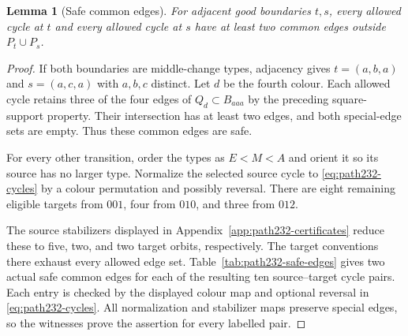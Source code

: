 \documentclass[11pt]{article}
\newtheorem{lemma}[theorem]{Lemma}
\theoremstyle{remark}
\numberwithin{equation}{section}
\numberwithin{table}{section}
\begin{document}
\begin{lemma}[Safe common edges]\label{lem:pathsafe}
For adjacent good boundaries $t,s$, every allowed cycle at $t$ and
every allowed cycle at $s$ have at least two common edges outside
$P_t\cup P_s$.
\end{lemma}
\begin{proof}
If both boundaries are middle-change types, adjacency gives
$t=(a,b,a)$ and $s=(a,c,a)$ with $a,b,c$ distinct. Let $d$ be the
fourth colour. Each allowed cycle retains three of the four edges
of $Q_d\subset B_{aaa}$ by the preceding square-support property.
Their intersection has at least two edges, and both special-edge
sets are empty. Thus these common edges are safe.

For every other transition, order the types as $E<M<A$ and orient
it so its source has no larger type. Normalize the selected source
cycle to \eqref{eq:path232-cycles} by a colour permutation and
possibly reversal. There are eight remaining eligible targets from
$001$, four from $010$, and three from $012$.

The source stabilizers displayed in
Appendix~\ref{app:path232-certificates} reduce these to five, two,
and two target orbits, respectively. The target conventions there
exhaust every allowed edge set. Table~\ref{tab:path232-safe-edges}
gives two actual safe common edges for each of the resulting ten
source--target cycle pairs. Each entry is checked by the displayed
colour map and optional reversal in \eqref{eq:path232-cycles}.
All normalization and stabilizer maps preserve special edges, so
the witnesses prove the assertion for every labelled pair.
\end{proof}
\end{document}
